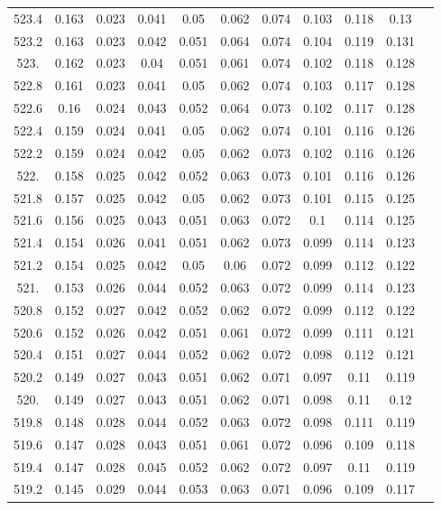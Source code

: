 \documentclass[12pt]{ctexart}
\numberwithin{equation}{section}
\begin{document}
\begin{longtable}{ccccccccccc}
523.4	&	0.163	&	0.023	&	0.041	&	0.05	&	0.062	&	0.074	&	0.103	&	0.118	&	0.13	\\
523.2	&	0.163	&	0.023	&	0.042	&	0.051	&	0.064	&	0.074	&	0.104	&	0.119	&	0.131	\\
523.	&	0.162	&	0.023	&	0.04	&	0.051	&	0.061	&	0.074	&	0.102	&	0.118	&	0.128	\\
522.8	&	0.161	&	0.023	&	0.041	&	0.05	&	0.062	&	0.074	&	0.103	&	0.117	&	0.128	\\
522.6	&	0.16	&	0.024	&	0.043	&	0.052	&	0.064	&	0.073	&	0.102	&	0.117	&	0.128	\\
522.4	&	0.159	&	0.024	&	0.041	&	0.05	&	0.062	&	0.074	&	0.101	&	0.116	&	0.126	\\
522.2	&	0.159	&	0.024	&	0.042	&	0.05	&	0.062	&	0.073	&	0.102	&	0.116	&	0.126	\\
522.	&	0.158	&	0.025	&	0.042	&	0.052	&	0.063	&	0.073	&	0.101	&	0.116	&	0.126	\\
521.8	&	0.157	&	0.025	&	0.042	&	0.05	&	0.062	&	0.073	&	0.101	&	0.115	&	0.125	\\
521.6	&	0.156	&	0.025	&	0.043	&	0.051	&	0.063	&	0.072	&	0.1	&	0.114	&	0.125	\\
521.4	&	0.154	&	0.026	&	0.041	&	0.051	&	0.062	&	0.073	&	0.099	&	0.114	&	0.123	\\
521.2	&	0.154	&	0.025	&	0.042	&	0.05	&	0.06	&	0.072	&	0.099	&	0.112	&	0.122	\\
521.	&	0.153	&	0.026	&	0.044	&	0.052	&	0.063	&	0.072	&	0.099	&	0.114	&	0.123	\\
520.8	&	0.152	&	0.027	&	0.042	&	0.052	&	0.062	&	0.072	&	0.099	&	0.112	&	0.122	\\
520.6	&	0.152	&	0.026	&	0.042	&	0.051	&	0.061	&	0.072	&	0.099	&	0.111	&	0.121	\\
520.4	&	0.151	&	0.027	&	0.044	&	0.052	&	0.062	&	0.072	&	0.098	&	0.112	&	0.121	\\
520.2	&	0.149	&	0.027	&	0.043	&	0.051	&	0.062	&	0.071	&	0.097	&	0.11	&	0.119	\\
520.	&	0.149	&	0.027	&	0.043	&	0.051	&	0.062	&	0.071	&	0.098	&	0.11	&	0.12	\\
519.8	&	0.148	&	0.028	&	0.044	&	0.052	&	0.063	&	0.072	&	0.098	&	0.111	&	0.119	\\
519.6	&	0.147	&	0.028	&	0.043	&	0.051	&	0.061	&	0.072	&	0.096	&	0.109	&	0.118	\\
519.4	&	0.147	&	0.028	&	0.045	&	0.052	&	0.062	&	0.072	&	0.097	&	0.11	&	0.119	\\
519.2	&	0.145	&	0.029	&	0.044	&	0.053	&	0.063	&	0.071	&	0.096	&	0.109	&	0.117	\\

\end{longtable}
\end{document}

